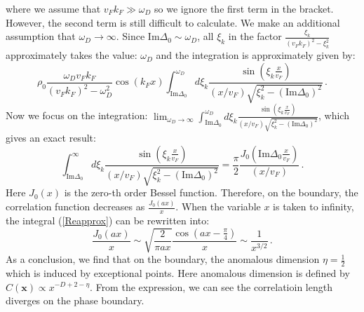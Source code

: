 \documentclass[aps,onecolumn,nofootinbib,superscriptaddress,notitlepage,longbibliography]{revtex4-1}
\begin{document}
where we assume that $v_{F}k_{F}\gg\omega_{D}$ so we ignore the first
term in the bracket. However, the second term is still difficult to
calculate. We make an additional assumption that $\omega_{D}\rightarrow\infty$.
Since $\text{Im}\Delta_{0}\sim\omega_{D}$, all $\xi_{k}$ in the
factor $\frac{\xi_{k}}{(v_{F}k_{F})^{2}-\xi_{k}^{2}}$ approximately
takes the value: $\omega_{D}$ and the integration is approximately
given by: 
\begin{equation}
\rho_{0}\frac{\omega_{D}v_{F}k_{F}}{(v_{F}k_{F})^{2}-\omega_{D}^{2}}\cos(k_{F}x)\int_{\text{Im}\Delta_{0}}^{\omega_{D}}d\xi_{k}\frac{\sin\left(\xi_{k}\frac{x}{v_{F}}\right)}{(x/v_{F})\sqrt{\xi_{k}^{2}-\left(\text{Im}\Delta_{0}\right)^{2}}}\,.\label{Reintegration}
\end{equation}
Now we focus on the integration: $\lim_{\omega_{D}\rightarrow\infty}\int_{\text{Im}\Delta_{0}}^{\omega_{D}}d\xi_{k}\frac{\sin\left(\xi_{k}\frac{x}{v_{F}}\right)}{(x/v_{F})\sqrt{\xi_{k}^{2}-\left(\text{Im}\Delta_{0}\right)^{2}}}$,
which gives an exact result: 
\begin{equation}
\int_{\text{Im}\Delta_{0}}^{\infty}d\xi_{k}\frac{\sin\left(\xi_{k}\frac{x}{v_{F}}\right)}{(x/v_{F})\sqrt{\xi_{k}^{2}-\left(\text{Im}\Delta_{0}\right)^{2}}}=\frac{\pi}{2}\frac{J_{0}\left(\text{Im}\Delta_{0}\frac{x}{v_{F}}\right)}{(x/v_{F})}\,.\label{Reapprox}
\end{equation}
Here $J_{0}(x)$ is the zero-th order Bessel function. Therefore,
on the boundary, the correlation function decreases as $\frac{J_{0}(ax)}{x}$.
When the variable $x$ is taken to infinity, the integral (\ref{Reapprox})
can be rewritten into: 
\begin{equation}
\frac{J_{0}(ax)}{x}\sim\sqrt{\frac{2}{\pi ax}}\frac{\cos\left(ax-\frac{\pi}{4}\right)}{x}\sim\frac{1}{x^{3/2}}\,.
\end{equation}
As a conclusion, we find that on the boundary, the anomalous dimension
$\eta=\frac{1}{2}$ which is induced by exceptional points. Here anomalous
dimension is defined by $C(\bm{x})\propto x^{-D+2-\eta}$. From the
expression, we can see the correlatioin length diverges on the phase
boundary.
\end{document}
